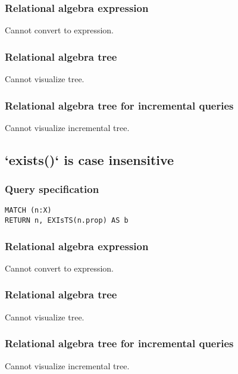 \subsubsection*{Relational algebra expression}

Cannot convert to expression.

\subsubsection*{Relational algebra tree}

Cannot visualize tree.

\subsubsection*{Relational algebra tree for incremental queries}

Cannot visualize incremental tree.

\subsection{`exists()` is case insensitive}

\subsubsection*{Query specification}

\begin{lstlisting}
MATCH (n:X)
RETURN n, EXIsTS(n.prop) AS b
\end{lstlisting}

\subsubsection*{Relational algebra expression}

Cannot convert to expression.

\subsubsection*{Relational algebra tree}

Cannot visualize tree.

\subsubsection*{Relational algebra tree for incremental queries}

Cannot visualize incremental tree.

